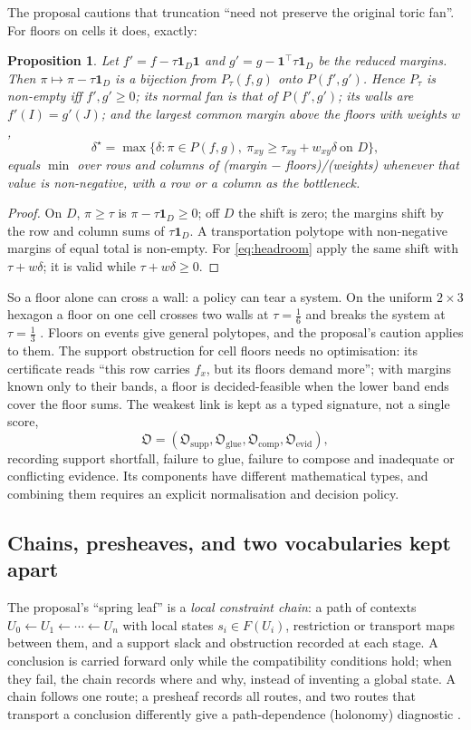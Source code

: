 \documentclass[11pt]{article}
\newtheorem{proposition}[theorem]{Proposition}
\theoremstyle{definition}
\theoremstyle{remark}
\begin{document}
The proposal cautions that truncation ``need not preserve the original toric fan''. For floors on cells it does, exactly:
\begin{proposition}\label{prop:reducedmargins}
Let $f'=f-\tau\mathbf 1_D\mathbf 1$ and $g'=g-\mathbf 1^\top\tau\mathbf 1_D$ be the reduced margins. Then
$\pi\mapsto\pi-\tau\mathbf 1_D$ is a bijection from $P_\tau(f,g)$ onto $P(f',g')$. Hence $P_\tau$ is non-empty iff $f',g'\ge0$; its
normal fan is that of $P(f',g')$; its walls are $f'(I)=g'(J)$; and the largest common margin above the floors with weights $w$,
\begin{equation}\label{eq:headroom}
\delta^\star=\max\{\delta:\pi\in P(f,g),\ \pi_{xy}\ge\tau_{xy}+w_{xy}\delta\ \text{on }D\},
\end{equation}
equals $\min$ over rows and columns of (margin $-$ floors)/(weights) whenever that value is non-negative, with a row or a column as
the bottleneck.
\end{proposition}
\begin{proof}On $D$, $\pi\ge\tau$ is $\pi-\tau\mathbf 1_D\ge0$; off $D$ the shift is zero; the margins shift by the row and column sums
of $\tau\mathbf 1_D$. A transportation polytope with non-negative margins of equal total is non-empty. For \eqref{eq:headroom} apply
the same shift with $\tau+w\delta$; it is valid while $\tau+w\delta\ge0$.\end{proof}
So a floor alone can cross a wall: a policy can tear a system. On the uniform $2\times3$ hexagon a floor on one cell crosses two walls at $\tau=\tfrac16$ and breaks the system at $\tau=\tfrac13$ \cite[Ex.~6.10]{Conditionals}. Floors on events give general polytopes, and the proposal's caution
applies to them. The support obstruction for cell floors needs no optimisation: its certificate reads ``this row carries $f_x$, but
its floors demand more''; with margins known only to their bands, a floor is decided-feasible when the lower band ends cover the
floor sums. The weakest link is kept as a typed signature, not a single score,
\[
\mathfrak O=(\mathfrak O_{\mathrm{supp}},\mathfrak O_{\mathrm{glue}},\mathfrak O_{\mathrm{comp}},\mathfrak O_{\mathrm{evid}}),
\]
recording support shortfall, failure to glue, failure to compose and inadequate or conflicting evidence. Its components have
different mathematical types, and combining them requires an explicit normalisation and decision policy.

\subsection{Chains, presheaves, and two vocabularies kept apart}
The proposal's ``spring leaf'' is a \emph{local constraint chain}: a path of contexts $U_0\leftarrow U_1\leftarrow\cdots\leftarrow U_n$
with local states $s_i\in F(U_i)$, restriction or transport maps between them, and a support slack and obstruction recorded at each
stage. A conclusion is carried forward only while the compatibility conditions hold; when they fail, the chain records where and
why, instead of inventing a global state. A chain follows one route; a presheaf records all routes, and two routes that transport
a conclusion differently give a path-dependence (holonomy) diagnostic \cite{HolonomyNote}.
\end{document}
